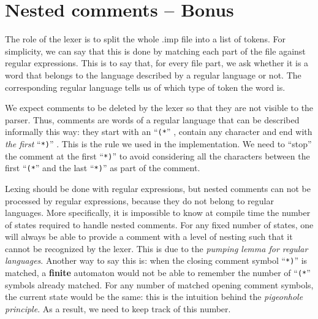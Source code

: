 \documentclass[12pt]{report}
\begin{document}
\chapter{Nested comments -- Bonus}

\newcommand{\stac}{``\texttt{(*}'' }
\newcommand{\stoc}{``\texttt{*)}'' }

The role of the lexer is to split the whole .imp file into a list of tokens.
For simplicity, we can say that this is done by matching each part of the file against regular expressions.
This is to say that, for every file part, we ask whether it is a word that belongs to the language described by a regular language or not.
The corresponding regular language tells us of which type of token the word is.

We expect comments to be deleted by the lexer so that they are not visible to the parser.
Thus, comments are words of a regular language that can be described informally this way: they start with an
\stac, contain any character and end with \emph{the first} \stoc.
This is the rule we used in the implementation.
We need to ``stop'' the comment at the first \stoc to avoid considering all the characters
between the first \stac and the last \stoc as part of the comment.

Lexing should be done with regular expressions, but nested comments can not be processed by regular expressions, because
they do not belong to regular languages. More specifically, it is impossible to know at compile time the number of states
required to handle nested comments.  For any fixed number of states, one will always be able to provide a comment with a
level of nesting such that it cannot be recognized by the lexer.  This is due to the \textit{pumping lemma for regular
languages}. Another way to say this is: when the closing comment symbol \stoc is matched, a \textbf{finite} automaton would not be able to
remember the number of \stac symbols already matched. For any number of matched opening comment symbols, the current state
would be the same: this is the intuition behind the \textit{pigeonhole principle}. As a result, we need to keep track of
this number.
\end{document}

